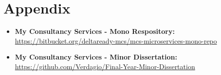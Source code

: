 \chapter{Appendix}
\begin{itemize}
\item \textbf{My Consultancy Services - Mono Respository:} \\ \url{https://bitbucket.org/deltaready-mcs/mcs-microservices-mono-repo}
\item \textbf{My Consultancy Services - Minor Dissertation:} \\ \url{https://github.com/Verdagio/Final-Year-Minor-Dissertation}
\end{itemize}
